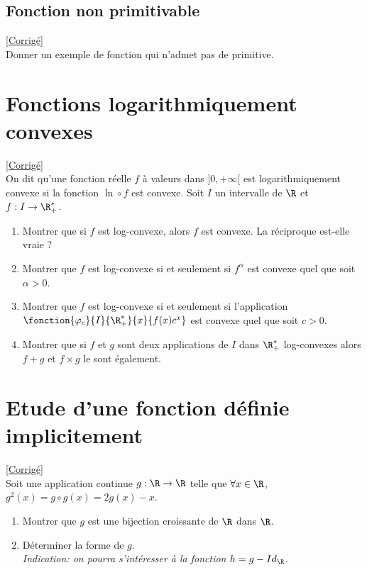 \documentclass{book}
\begin{document}
	\subsection{Fonction non primitivable }
	\textcolor{blue}{\hyperref[Fonction non primitivable corrigé]{[Corrigé]}}\\
	\label{Fonction non primitivable}
	Donner un exemple de fonction qui n'admet pas de primitive.
	
	\section{Fonctions logarithmiquement convexes }
	\textcolor{blue}{\hyperref[Fonctions logarithmiquement convexes corrigé]{[Corrigé]}}\\
	\label{Fonctions logarithmiquement convexes}
	On dit qu'une fonction réelle $f$ à valeurs dans $]0,+\infty[$ est logarithmiquement convexe si la fonction $\ln\circ f$ est convexe.
	Soit $I$ un intervalle de $\R$ et $f:I\to\R_+^*$.
	\begin{enumerate}
		\item Montrer que si $f$ est log-convexe, alors $f$ est convexe. La réciproque est-elle vraie ?
		\item Montrer que $f$ est log-convexe si et seulement si $f^\alpha$ est convexe quel que soit $\alpha>0$.
		\item Montrer que $f$ est log-convexe si et seulement si l'application 
		$\fonction{\varphi_c}{I}{\R_+^*}{x}{f(x)c^x}$ est convexe quel que soit $c>0$.
		\item Montrer que si $f$ et $g$ sont deux applications de $I$ dans $\R_+^*$ log-convexes alors $f+g$ et $f\times g$ le sont également.
	\end{enumerate}
	
	\section{Etude d'une fonction définie implicitement }
	\textcolor{blue}{\hyperref[Etude d'une fonction définie implicitement corrigé]{[Corrigé]}}\\
	\label{Etude d'une fonction définie implicitement}
	Soit une application continue $g:\R\to\R$ telle que $\forall x\in\R$, $g^2(x)=g\circ g(x)=2g(x)-x$.
	\begin{enumerate}
		\item Montrer que $g$ est une bijection croissante de $\R$ dans $\R$.
		\item Déterminer la forme de $g$. \\\textit{Indication: on pourra s'intéresser à la fonction $h=g-Id_\R$.}
	\end{enumerate}
	
\end{document}
